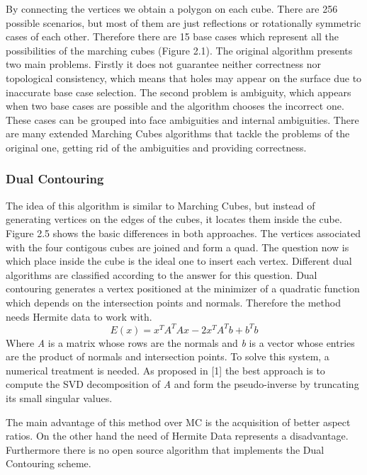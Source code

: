By connecting the vertices we obtain a polygon on each cube. There are 256 possible scenarios,
but most of them are just reflections or rotationally symmetric cases of each other. Therefore
there are 15 base cases which represent all the possibilities of the marching cubes (Figure 2.1). 
The original algorithm presents two main problems. Firstly it does not guarantee neither
correctness nor topological consistency, which means that holes may appear on the surface due
to inaccurate base case selection. The second problem is ambiguity, which appears when two
base cases are possible and the algorithm chooses the incorrect one. These cases can be grouped
into face ambiguities and internal ambiguities. There are many extended Marching Cubes
algorithms that tackle the problems of the original one, getting rid of the ambiguities and
providing correctness.

\subsubsection{Dual Contouring}
The idea of this algorithm is similar to Marching Cubes, but instead of generating vertices on the
edges of the cubes, it locates them inside the cube. Figure 2.5 shows the basic differences in both approaches.
The vertices associated with the four contigous cubes are joined and form a quad. The question now is
which place inside the cube is the ideal one to insert each vertex. Different dual algorithms are classified 
according to the answer for this question. Dual contouring generates a vertex positioned at the minimizer of a
quadratic function which depends on the intersection points and normals. Therefore the method needs Hermite 
data to work with.
\begin{equation*}
E(x)= x^TA^TAx-2x^TA^Tb+b^Tb
\end{equation*}
Where \textit{A} is a matrix whose rows are the normals and \textit{b} is a vector whose entries are the product of normals and intersection points. To solve this system, a numerical treatment is needed. As proposed in [1] the best approach is to compute the
SVD decomposition of \textit{A} and form the pseudo-inverse by truncating its small singular values. 


The main advantage of this method over MC is the acquisition of better aspect ratios. On the other hand the need of Hermite Data
represents a disadvantage. Furthermore there is no open source algorithm that implements the Dual Contouring scheme.


